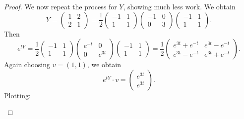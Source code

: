 \documentclass[11pt, letterpaper]{article}
\theoremstyle{plain}
\begin{document}
\begin{proof}
We now repeat the process for $Y$, showing much less work. We obtain
\[
	Y=\begin{pmatrix}
	1 & 2 \\
	2 & 1
	\end{pmatrix}=\frac{1}{2} \begin{pmatrix}
	-1 & 1 \\
	1 & 1
	\end{pmatrix}\begin{pmatrix}
	-1 & 0 \\
	0 & 3
	\end{pmatrix}\begin{pmatrix}
	-1 & 1 \\
	1 & 1
	\end{pmatrix}
.\]
Then
\[
	e^{tY} =\frac{1}{2} \begin{pmatrix}
	-1 & 1 \\
	1 & 1
	\end{pmatrix}\begin{pmatrix}
	e^{-t}  & 0 \\
	0 & e^{3t} 
	\end{pmatrix}\begin{pmatrix}
	-1 & 1 \\
	1 & 1
	\end{pmatrix}=\frac{1}{2} \begin{pmatrix}
	 e^{3t} +e^{-t}  & e^{3t} -e^{-t}  \\
	e^{3t} -e^{-t}  & e^{3t} +e^{-t} 
	\end{pmatrix} 
.\]
Again choosing $v=(1,1)$, we obtain
\[
	e^{tY} \cdot v=\begin{pmatrix}
	e^{3t}  \\
	e^{3t} 
	\end{pmatrix}
.\]
Plotting:

	\begin{center}
\end{center}
\end{proof}
\end{document}
